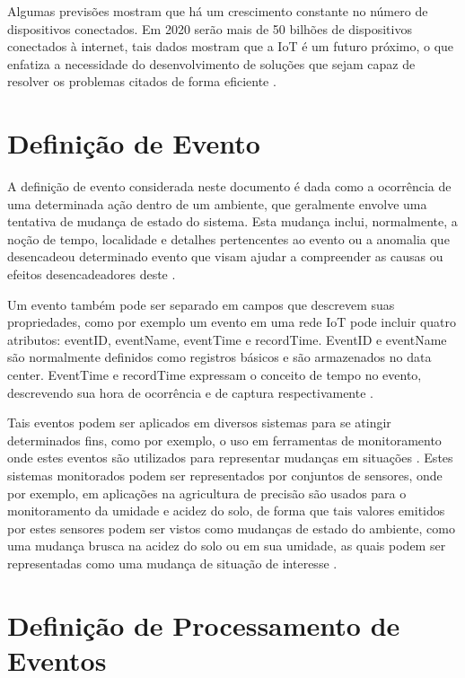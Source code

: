 \documentclass[ti,table]{texufpel} %
\begin{document}
  

  

Algumas previsões mostram que há um crescimento constante no número de dispositivos conectados. Em 2020 serão mais de 50 bilhões de dispositivos conectados à internet, tais dados mostram que a IoT é um futuro próximo, o que enfatiza a necessidade do desenvolvimento de soluções que sejam capaz de resolver os problemas citados de forma eficiente \cite{xavier2016smart}. 

  

\section{Definição de Evento} 

A definição de evento considerada neste documento é dada como a ocorrência de uma determinada ação dentro de um ambiente, que geralmente envolve uma tentativa de mudança de estado do sistema. Esta mudança inclui, normalmente, a noção de tempo, localidade e detalhes pertencentes ao evento ou a anomalia que desencadeou determinado evento que visam ajudar a compreender as causas ou efeitos desencadeadores deste \cite{fitzgerald2010common}. 

Um evento também pode ser separado em campos que descrevem suas propriedades, como por exemplo um evento em uma rede IoT pode incluir quatro atributos: eventID, eventName, eventTime e recordTime. EventID e eventName são normalmente definidos como registros básicos e são armazenados no data center. EventTime e recordTime expressam o conceito de tempo no evento, descrevendo sua hora de ocorrência e de captura respectivamente \cite{minbo2013information}.  

  

Tais eventos podem ser aplicados em diversos sistemas para se atingir determinados fins, como por exemplo, o uso em ferramentas de monitoramento onde estes eventos são utilizados para representar mudanças em situações \cite{etzion2011event}. Estes sistemas monitorados podem ser representados por conjuntos de sensores, onde por exemplo, em aplicações na agricultura de precisão são usados para o monitoramento da umidade e acidez do solo, de forma que tais valores emitidos por estes sensores podem ser vistos como mudanças de estado do ambiente, como uma mudança brusca na acidez do solo ou em sua umidade, as quais podem ser representadas como uma mudança de situação de interesse \cite{garcia2011wireless}. 

  

\section{Definição de Processamento de Eventos} 
\end{document}
